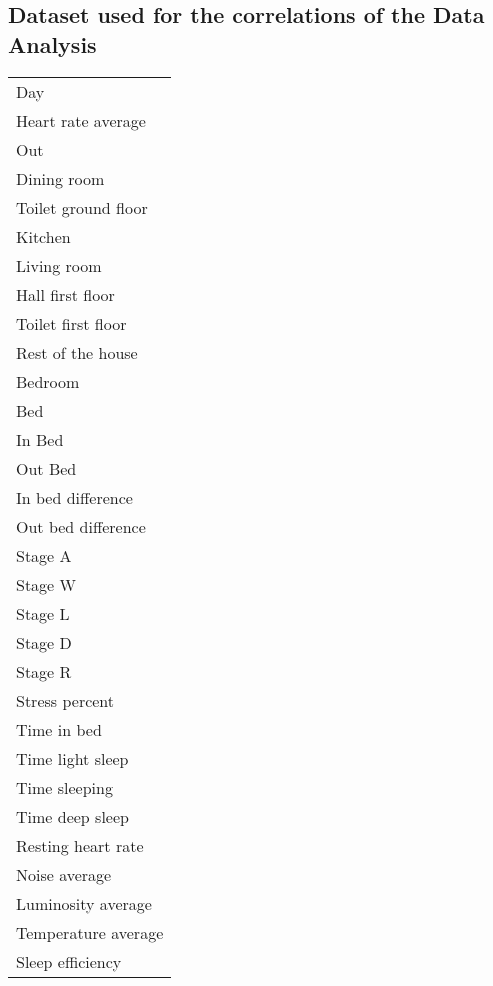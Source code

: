 \begin{appendices}
		\subsection{Dataset used for the correlations of the Data Analysis}
			\begin{tabular}{l}
				Day\\
				Heart rate average\\
				Out\\
				Dining room\\
				Toilet ground floor\\
				Kitchen\\
				Living room\\
				Hall first floor\\
				Toilet first floor\\
				Rest of the house\\
				Bedroom\\
				Bed\\
				In Bed\\
				Out Bed \\
				In bed difference\\
				Out bed difference\\
				Stage A\\
				Stage W\\
				Stage L\\
				Stage D\\
				Stage R\\
				Stress percent\\
				Time in bed\\
				Time light sleep\\
				Time sleeping\\
				Time deep sleep\\
				Resting heart rate\\
				Noise average\\
				Luminosity average\\
				Temperature average\\
				Sleep efficiency
			\end{tabular}
\end{appendices}
